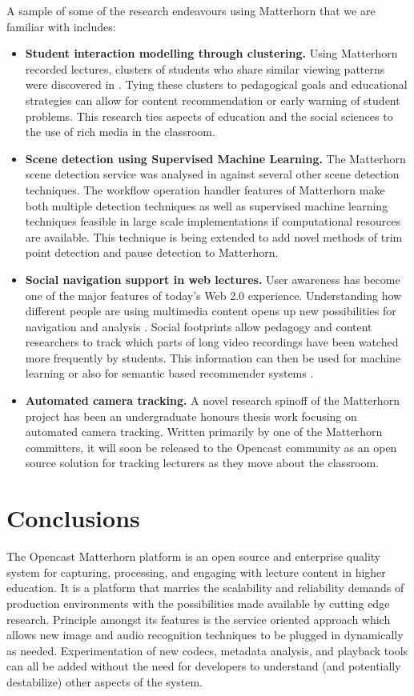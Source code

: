 \documentclass[letterpaper]{sig-alternate}
\begin{document}
A sample of some of the research endeavours using Matterhorn that we are familiar with includes:
\begin{itemize}
\item \textbf{Student interaction modelling through clustering.}   Using Matterhorn recorded lectures, clusters of students who share similar viewing patterns were discovered in \cite{Brooks2010}.  Tying these clusters to pedagogical goals and educational strategies can allow for content recommendation or early warning of student problems.  This research ties aspects of education and the social sciences to the use of rich media in the classroom. 
\item \textbf{Scene detection using Supervised Machine Learning.}  The Matterhorn scene detection service was analysed in \cite{Johnston2011} against several other scene detection techniques.  The workflow operation handler features of Matterhorn make both multiple detection techniques as well as supervised machine learning techniques feasible in large scale implementations if computational resources are available.  This technique is being extended to add novel methods of trim point detection and pause detection to Matterhorn.
\item \textbf{Social navigation support in web lectures.} User awareness has become one of the major features of today's Web 2.0 experience. Understanding how different people are using multimedia content opens up new possibilities for navigation and analysis \cite{KMV09}. Social footprints allow pedagogy and content researchers to track which parts of long video recordings have been watched more frequently by students. This information can then be used for machine learning or also for semantic based recommender systems \cite{Ketterl:2010:USN:1912600.1912699}.
\item \textbf{Automated camera tracking.} A novel research spinoff of the Matterhorn project has been an undergraduate honours thesis work focusing on automated camera tracking.  Written primarily by one of the Matterhorn committers, it will soon be released to the Opencast community as an open source solution for tracking lecturers as they move about the classroom.
\end{itemize}

\section{Conclusions}
The Opencast Matterhorn platform is an open source and enterprise quality system for capturing, processing, and engaging with lecture content in higher education.  It is a platform that marries the scalability and reliability demands of production environments with the possibilities made available by cutting edge research.  Principle amongst its features is the service oriented approach which allows new image and audio recognition techniques to be plugged in dynamically as needed.  Experimentation of new codecs, metadata analysis, and playback tools can all be added without the need for developers to understand (and potentially destabilize) other aspects of the system.
\end{document}
